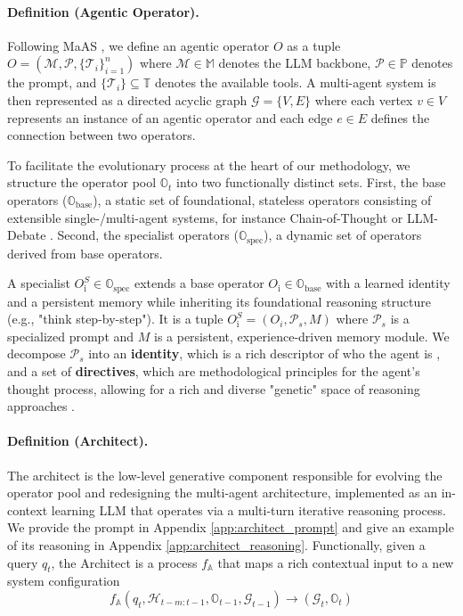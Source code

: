 \documentclass{article} %
\begin{document}
\paragraph{Definition (Agentic Operator).} Following MaAS \citep{zhang2025multi}, we define an agentic operator $O$ as a tuple $O = ( \mathcal{M}, \mathcal{P}, \{\mathcal{T}_i\}_{i=1}^n)$ where $\mathcal{M} \in \mathbb{M}$ denotes the LLM backbone, $\mathcal{P} \in \mathbb{P}$ denotes the prompt, and $\{\mathcal{T}_i\} \subseteq \mathbb{T}$ denotes the available tools. A multi-agent system is then represented as a directed acyclic graph \(\mathcal{G} = \{V,E\}\) where each vertex \(v \in V\) represents an instance of an agentic operator and each edge \(e \in E\) defines the connection between two operators. 

To facilitate the evolutionary process at the heart of our methodology, we structure the operator pool \(\mathbb{O}_t\) into two functionally distinct sets. First, the base operators (\(\mathbb{O}_\text{base}\)), a static set of foundational, stateless operators consisting of extensible single-/multi-agent systems, for instance Chain-of-Thought \citep{wei2022chain} or LLM-Debate \citep{du2023improving}. Second, the specialist operators (\(\mathbb{O}_\text{spec}\)), a dynamic set of operators derived from base operators. 

A specialist \(O_\text{i}^{S} \in \mathbb{O}_\text{spec}\) extends a base operator \(O_\text{i} \in \mathbb{O}_\text{base}\) with a learned identity and a persistent memory while inheriting its foundational reasoning structure (e.g., "think step-by-step"). It is a tuple \(O_\text{i}^{S} = (O_i, \mathcal{P}_s, M) \) where \(\mathcal{P}_s\) is a specialized prompt and $M$ is a persistent, experience-driven memory module. We decompose \(\mathcal{P}_s\) into an \textbf{identity}, which is a rich descriptor of who the agent is \citep{xu2023expertprompting}, and a set of \textbf{directives}, which are methodological principles for the agent's thought process, allowing for a rich and diverse "genetic" space of reasoning approaches \citep{naik2023diversity}.


\paragraph{Definition (Architect).} The architect is the low-level generative component responsible for evolving the operator pool and redesigning the multi-agent architecture, implemented as an in-context learning LLM that operates via a multi-turn iterative reasoning process. We provide the prompt in Appendix \ref{app:architect_prompt} and give an example of its reasoning in Appendix \ref{app:architect_reasoning}. Functionally, given a query \(q_t\), the Architect is a process \(f_{\mathbb{A}}\) that maps a rich contextual input to a new system configuration
\begin{equation}
\label{eq:architect_def}
    f_{\mathbb{A}} ( q_t, \mathcal{H}_{t-m:t-1}, \mathbb{O}_{t-1}, \mathcal{G}_{t-1} ) \to (\mathcal{G}_t, \mathbb{O}_t)
\end{equation}
\end{document}

